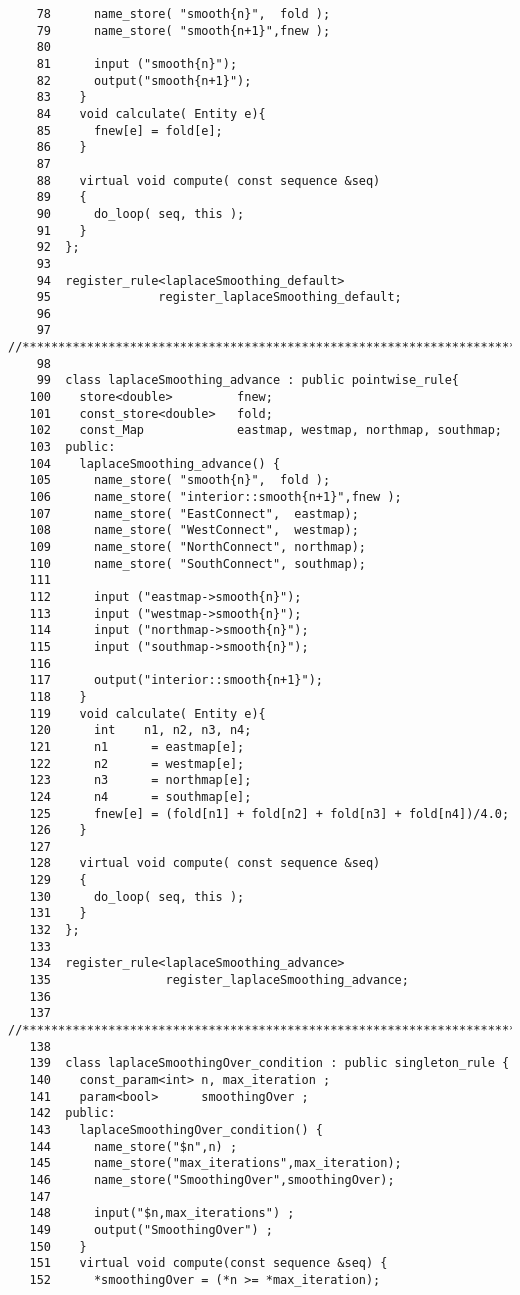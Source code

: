 \begin{verbatim}
    78      name_store( "smooth{n}",  fold );
    79      name_store( "smooth{n+1}",fnew );
    80
    81      input ("smooth{n}");
    82      output("smooth{n+1}");
    83    }
    84    void calculate( Entity e){
    85      fnew[e] = fold[e];
    86    }
    87
    88    virtual void compute( const sequence &seq)
    89    {
    90      do_loop( seq, this );
    91    }
    92  };
    93
    94  register_rule<laplaceSmoothing_default>
    95               register_laplaceSmoothing_default;
    96
    97  //*********************************************************************
    98
    99  class laplaceSmoothing_advance : public pointwise_rule{
   100    store<double>         fnew;
   101    const_store<double>   fold;
   102    const_Map             eastmap, westmap, northmap, southmap;
   103  public:
   104    laplaceSmoothing_advance() {
   105      name_store( "smooth{n}",  fold );
   106      name_store( "interior::smooth{n+1}",fnew );
   107      name_store( "EastConnect",  eastmap);
   108      name_store( "WestConnect",  westmap);
   109      name_store( "NorthConnect", northmap);
   110      name_store( "SouthConnect", southmap);
   111
   112      input ("eastmap->smooth{n}");
   113      input ("westmap->smooth{n}");
   114      input ("northmap->smooth{n}");
   115      input ("southmap->smooth{n}");
   116
   117      output("interior::smooth{n+1}");
   118    }
   119    void calculate( Entity e){
   120      int    n1, n2, n3, n4;
   121      n1      = eastmap[e];
   122      n2      = westmap[e];
   123      n3      = northmap[e];
   124      n4      = southmap[e];
   125      fnew[e] = (fold[n1] + fold[n2] + fold[n3] + fold[n4])/4.0;
   126    }
   127
   128    virtual void compute( const sequence &seq)
   129    {
   130      do_loop( seq, this );
   131    }
   132  };
   133
   134  register_rule<laplaceSmoothing_advance>
   135                register_laplaceSmoothing_advance;
   136
   137  //*********************************************************************
   138
   139  class laplaceSmoothingOver_condition : public singleton_rule {
   140    const_param<int> n, max_iteration ;
   141    param<bool>      smoothingOver ;
   142  public:
   143    laplaceSmoothingOver_condition() {
   144      name_store("$n",n) ;
   145      name_store("max_iterations",max_iteration);
   146      name_store("SmoothingOver",smoothingOver);
   147
   148      input("$n,max_iterations") ;
   149      output("SmoothingOver") ;
   150    }
   151    virtual void compute(const sequence &seq) {
   152      *smoothingOver = (*n >= *max_iteration);

\end{verbatim}
